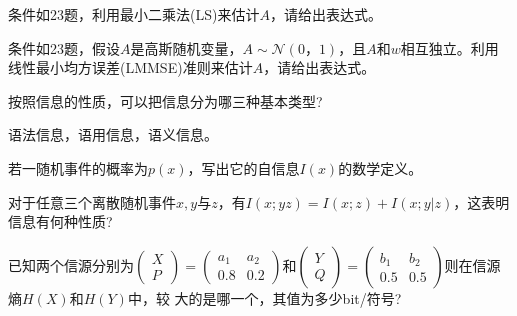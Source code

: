 \begin{problem}
	条件如23题，利用最小二乘法(LS)来估计$A$，请给出表达式。
\end{problem}
\begin{solution}

\end{solution}


\begin{problem}
	条件如23题，假设$A$是高斯随机变量，$A\sim\mathcal{N}(0，1)$，且$A$和$w$相互独立。利用线性最小均方误差(LMMSE)准则来估计$A$，请给出表达式。
\end{problem}
\begin{solution}

\end{solution}


\begin{problem}
	按照信息的性质，可以把信息分为哪三种基本类型?
\end{problem}
\begin{solution}
	语法信息，语用信息，语义信息。
\end{solution}


\begin{problem}
	若一随机事件的概率为$p(x)$，写出它的自信息$I(x)$的数学定义。
\end{problem}
\begin{solution}
	
\end{solution}


\begin{problem}
	对于任意三个离散随机事件$x,y$与$z$，有$I(x;yz)=I(x;z)+I(x;y|z)$，这表明信息有何种性质?
\end{problem}
\begin{solution}

\end{solution}


\begin{problem}
	已知两个信源分别为$\begin{pmatrix}X\\P\end{pmatrix}=\begin{pmatrix}a_1&a_2\\0.8&0.2\end{pmatrix}$和$\begin{pmatrix}Y\\Q\end{pmatrix}=\begin{pmatrix}b_1&b_2\\0.5&0.5\end{pmatrix}$则在信源熵$H(X)$和$H(Y)$中，较 大的是哪一个，其值为多少bit/符号?
\end{problem}
\begin{solution}

\end{solution}


